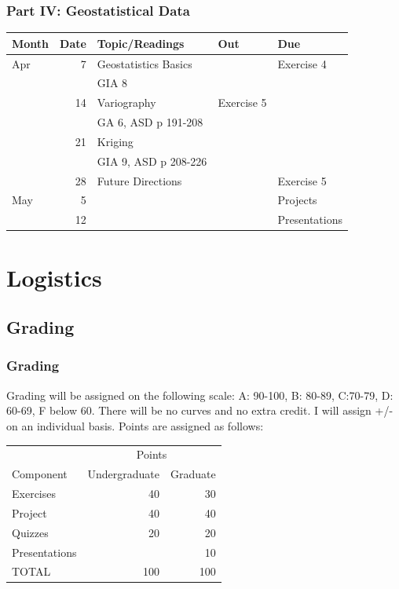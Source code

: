 \documentclass[nototal,handout]{beamer}
\begin{document}
\begin{frame}
	\frametitle{Part IV: Geostatistical Data}
  \begin{center}
    \begin{footnotesize}
\begin{tabular}{|lr|l|l|l|}
\hline
Month & \multicolumn{1}{l|}{Date} & Topic/Readings & Out & Due \\ \hline
Apr & 7 & Geostatistics Basics &  & Exercise 4 \\ 
    &    & GIA 8& &\\
 & 14 & Variography& Exercise 5 &  \\ 
    &    &  GA 6, ASD p 191-208 & &\\
 & 21 & Kriging &  &  \\ 
    &    & GIA 9, ASD p 208-226& &\\
 & 28 & Future Directions &  & Exercise 5 \\ 
May & 5 &  &  & Projects \\ 
 & 12 &  &  & Presentations \\ \hline
\end{tabular}
    \end{footnotesize}
  \end{center}
 \end{frame} 

\section{Logistics} 

\subsection{Grading} 

\begin{frame}
	\frametitle{Grading}
 
 Grading will be assigned on the following scale: A: 90-100, B:
80-89, C:70-79, D: 60-69, F below 60. There will be no curves and no extra
credit. I will assign +/- on an individual basis. Points are assigned as
follows:

\vspace{.1in}
\begin{center}
\begin{tabular}[h]{|l|rr|}
  \hline
  &\multicolumn{2}{|c|}{Points}\\
  Component&Undergraduate&Graduate\\
  \hline
  Exercises&40&30\\
  Project&40&40\\
  Quizzes&20&20\\
  Presentations& &10\\
  \hline
  TOTAL&100&100\\ \hline
\end{tabular}
\end{center}
\vspace{.1in}

\end{frame} 
\end{document}
